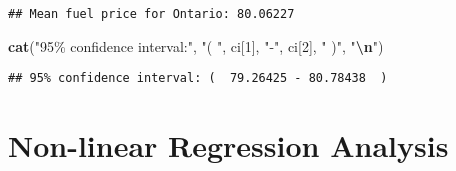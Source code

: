 \documentclass[
]{article}
\newenvironment{Shaded}{\begin{snugshade}}{\end{snugshade}}
\newcommand{\DecValTok}[1]{\textcolor[rgb]{0.00,0.00,0.81}{#1}}
\newcommand{\FunctionTok}[1]{\textcolor[rgb]{0.13,0.29,0.53}{\textbf{#1}}}
\newcommand{\NormalTok}[1]{#1}
\newcommand{\SpecialCharTok}[1]{\textcolor[rgb]{0.81,0.36,0.00}{\textbf{#1}}}
\newcommand{\StringTok}[1]{\textcolor[rgb]{0.31,0.60,0.02}{#1}}
\begin{document}
\begin{verbatim}
## Mean fuel price for Ontario: 80.06227
\end{verbatim}

\begin{Shaded}
\begin{Highlighting}[]
\FunctionTok{cat}\NormalTok{(}\StringTok{"95\% confidence interval:"}\NormalTok{, }\StringTok{"( "}\NormalTok{, ci[}\DecValTok{1}\NormalTok{], }\StringTok{"{-}"}\NormalTok{, ci[}\DecValTok{2}\NormalTok{], }\StringTok{" )"}\NormalTok{, }\StringTok{"}\SpecialCharTok{\textbackslash{}n}\StringTok{"}\NormalTok{)}
\end{Highlighting}
\end{Shaded}

\begin{verbatim}
## 95% confidence interval: (  79.26425 - 80.78438  )
\end{verbatim}

\section{Non-linear Regression
Analysis}\label{non-linear-regression-analysis}
\end{document}
